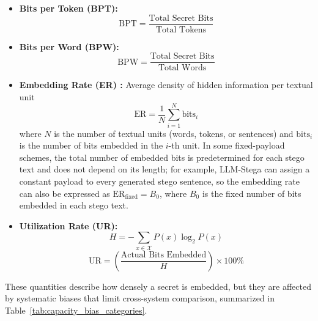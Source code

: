 \begin{itemize}
  \item \textbf{Bits per Token (BPT):}
        \begin{equation}
          \text{BPT} = \frac{\text{Total Secret Bits}}{\text{Total Tokens}}
        \end{equation}
  \item \textbf{Bits per Word (BPW):}
        \begin{equation}
          \text{BPW} = \frac{\text{Total Secret Bits}}{\text{Total Words}}
        \end{equation}
  \item \textbf{Embedding Rate (ER) \cite{10.1007/3-540-49380-8_21}:} Average density of hidden information per textual unit
        \begin{equation}
          \text{ER} = \frac{1}{N} \sum_{i=1}^{N} \text{bits}_i
        \end{equation}
        where $N$ is the number of textual units (words, tokens, or sentences) and $\text{bits}_i$ is the number of bits embedded in the $i$-th unit. In some fixed-payload schemes, the total number of embedded bits is predetermined for each stego text and does not depend on its length; for example, LLM-Stega can assign a constant payload to every generated stego sentence, so the embedding rate can also be expressed as $\text{ER}_{\text{fixed}} = B_0$, where $B_0$ is the fixed number of bits embedded in each stego text.
  \item \textbf{Utilization Rate (UR):}
        \begin{equation}
          H = -\sum_{x \in \mathcal{X}} P(x) \log_2 P(x)
        \end{equation}
        \begin{equation}
          \text{UR} = \left( \frac{\text{Actual Bits Embedded}}{H} \right) \times 100\%
        \end{equation}
\end{itemize}

These quantities describe how densely a secret is embedded, but they are affected by systematic biases that limit cross-system comparison, summarized in Table~\ref{tab:capacity_bias_categories}.

